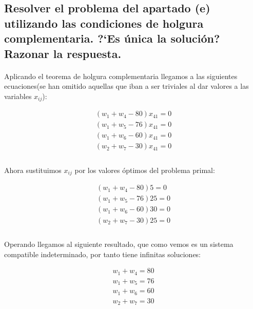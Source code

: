 \documentclass[10pt, a4paper]{article}
\begin{document}
		\subsection{Resolver el problema del apartado (e) utilizando las condiciones de holgura complementaria. ?`Es única la solución? Razonar la respuesta.}

			\paragraph{}
			Aplicando el teorema de holgura complementaria llegamos a las siguientes ecuaciones(se han omitido aquellas que iban a ser triviales al dar valores a las variables \(x_{ij}\)):

			\[
			\begin{split}
				(w_{1} + w_{4} - 80)x_{41} = 0 \\
				(w_{1} + w_{5} - 76)x_{41} = 0 \\
				(w_{1} + w_{6} - 60)x_{41} = 0 \\
				(w_{2} + w_{7} - 30)x_{41} = 0 \\
			\end{split}
			\]

			\paragraph{}
			Ahora sustituimos \(x_{ij}\) por los valores óptimos del problema primal:

			\[
			\begin{split}
				(w_{1} + w_{4} - 80)5 = 0 \\
				(w_{1} + w_{5} - 76)25 = 0 \\
				(w_{1} + w_{6} - 60)30 = 0 \\
				(w_{2} + w_{7} - 30)25 = 0 \\
			\end{split}
			\]
			\paragraph{}
			Operando llegamos al siguiente resultado, que como vemos es un sistema compatible indeterminado, por tanto tiene infinitas soluciones:

			\[
			\begin{split}
				w_{1} + w_{4} = 80 \\
				w_{1} + w_{5} = 76 \\
				w_{1} + w_{6} = 60 \\
				w_{2} + w_{7} = 30 \\
			\end{split}
			\]
\end{document}
